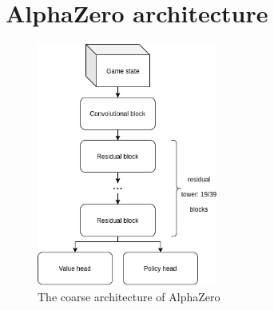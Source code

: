 \documentclass{../lib/llncs}
\begin{document}
\section{AlphaZero architecture}

\begin{figure}[!h]
  \centering
  \includegraphics[height=8cm, keepaspectratio]{alphazero_architecture_network.png}
  \caption{The coarse architecture of AlphaZero \cite{silver_mastering_2017}}
  \label{alphazero_architecture}
\end{figure}
\end{document}
